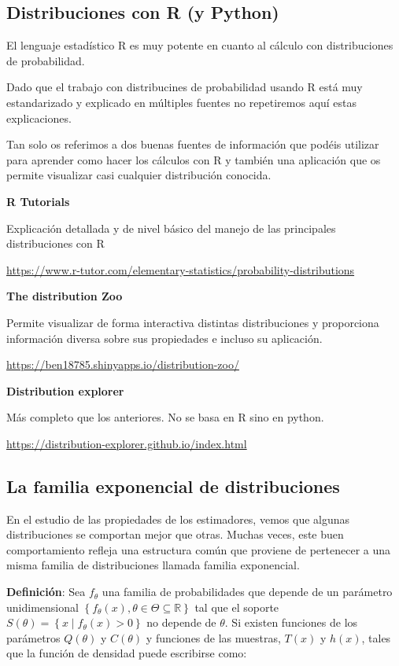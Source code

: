 \documentclass[
]{article}
\begin{document}
\subsection{Distribuciones con R (y Python)}\label{distribuciones-con-r-y-python}

El lenguaje estadístico R es muy potente en cuanto al cálculo con distribuciones de probabilidad.

Dado que el trabajo con distribucines de probabilidad usando R está muy estandarizado y explicado en múltiples fuentes no repetiremos aquí estas explicaciones.

Tan solo os referimos a dos buenas fuentes de información que podéis utilizar para aprender como hacer los cálculos con R y también una aplicación que os permite visualizar casi cualquier distribución conocida.

\textbf{R Tutorials}

Explicación detallada y de nivel básico del manejo de las principales distribuciones con R

\url{https://www.r-tutor.com/elementary-statistics/probability-distributions}

\textbf{The distribution Zoo}

Permite visualizar de forma interactiva distintas distribuciones y proporciona información diversa sobre sus propiedades e incluso su aplicación.

\url{https://ben18785.shinyapps.io/distribution-zoo/}

\textbf{Distribution explorer}

Más completo que los anteriores. No se basa en R sino en python.

\url{https://distribution-explorer.github.io/index.html}

\subsection{La familia exponencial de distribuciones}\label{la-familia-exponencial-de-distribuciones}

En el estudio de las propiedades de los estimadores, vemos que algunas distribuciones se comportan mejor que otras. Muchas veces, este buen comportamiento refleja una estructura común que proviene de pertenecer a una misma familia de distribuciones llamada familia exponencial.

\textbf{Definición}: Sea \(f_{\theta}\) una familia de probabilidades que depende de un parámetro unidimensional \(\left\{f_{\theta}(x), \theta \in \Theta \subseteq \mathbb{R}\right\}\) tal que el soporte \(S(\theta)=\left\{x \mid f_{\theta}(x)>0\right\}\) no depende de \(\theta\). Si existen funciones de los parámetros \(Q(\theta)\) y \(C(\theta)\) y funciones de las muestras, \(T(x)\) y \(h(x)\), tales que la función de densidad puede escribirse como:
\end{document}
